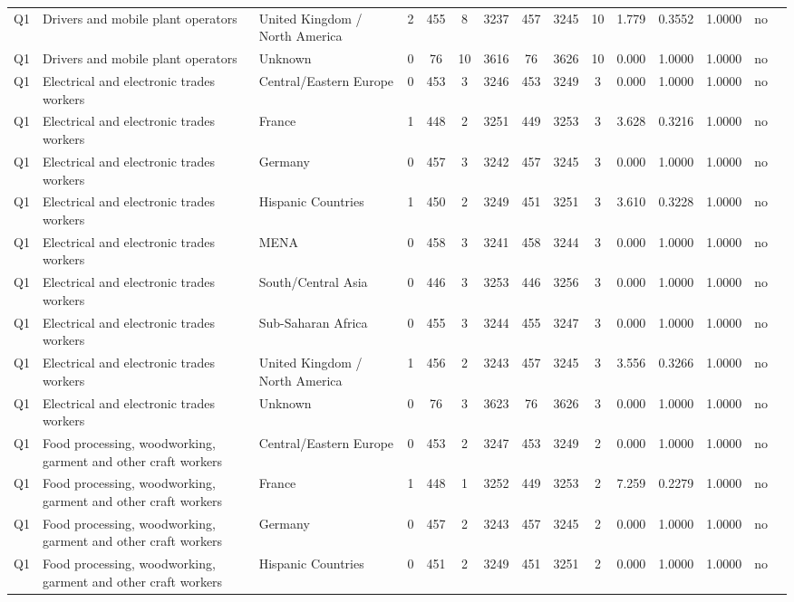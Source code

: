 \begin{longtable}{lllrcccccccccll}
Q1 & Drivers and mobile plant operators & United Kingdom / North America & 2 & 455 & 8 & 3237 & 457 & 3245 & 10 & 1.779 & 0.3552 & 1.0000 & no \\
Q1 & Drivers and mobile plant operators & Unknown & 0 & 76 & 10 & 3616 & 76 & 3626 & 10 & 0.000 & 1.0000 & 1.0000 & no \\
Q1 & Electrical and electronic trades workers & Central/Eastern Europe & 0 & 453 & 3 & 3246 & 453 & 3249 & 3 & 0.000 & 1.0000 & 1.0000 & no \\
Q1 & Electrical and electronic trades workers & France & 1 & 448 & 2 & 3251 & 449 & 3253 & 3 & 3.628 & 0.3216 & 1.0000 & no \\
Q1 & Electrical and electronic trades workers & Germany & 0 & 457 & 3 & 3242 & 457 & 3245 & 3 & 0.000 & 1.0000 & 1.0000 & no \\
Q1 & Electrical and electronic trades workers & Hispanic Countries & 1 & 450 & 2 & 3249 & 451 & 3251 & 3 & 3.610 & 0.3228 & 1.0000 & no \\
Q1 & Electrical and electronic trades workers & MENA & 0 & 458 & 3 & 3241 & 458 & 3244 & 3 & 0.000 & 1.0000 & 1.0000 & no \\
Q1 & Electrical and electronic trades workers & South/Central Asia & 0 & 446 & 3 & 3253 & 446 & 3256 & 3 & 0.000 & 1.0000 & 1.0000 & no \\
Q1 & Electrical and electronic trades workers & Sub-Saharan Africa & 0 & 455 & 3 & 3244 & 455 & 3247 & 3 & 0.000 & 1.0000 & 1.0000 & no \\
Q1 & Electrical and electronic trades workers & United Kingdom / North America & 1 & 456 & 2 & 3243 & 457 & 3245 & 3 & 3.556 & 0.3266 & 1.0000 & no \\
Q1 & Electrical and electronic trades workers & Unknown & 0 & 76 & 3 & 3623 & 76 & 3626 & 3 & 0.000 & 1.0000 & 1.0000 & no \\
Q1 & Food processing, woodworking, garment and other craft workers & Central/Eastern Europe & 0 & 453 & 2 & 3247 & 453 & 3249 & 2 & 0.000 & 1.0000 & 1.0000 & no \\
Q1 & Food processing, woodworking, garment and other craft workers & France & 1 & 448 & 1 & 3252 & 449 & 3253 & 2 & 7.259 & 0.2279 & 1.0000 & no \\
Q1 & Food processing, woodworking, garment and other craft workers & Germany & 0 & 457 & 2 & 3243 & 457 & 3245 & 2 & 0.000 & 1.0000 & 1.0000 & no \\
Q1 & Food processing, woodworking, garment and other craft workers & Hispanic Countries & 0 & 451 & 2 & 3249 & 451 & 3251 & 2 & 0.000 & 1.0000 & 1.0000 & no \\

\end{longtable}
